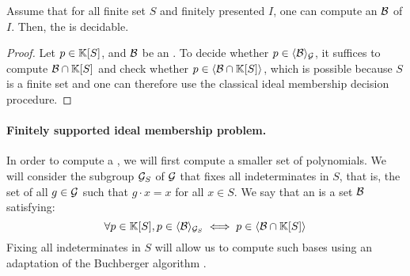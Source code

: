 \begin{lemma}
    Assume that for all finite set $S$ and 
    finitely presented  $I$,
    one can compute an 
     $\Basis$ of $I$.
    Then, the
    is decidable.
\end{lemma}
\begin{proof}
    Let $p \in \mathbb{K}[S]$, 
    and $\Basis$ be an .
    To decide whether $p \in \gen{\Basis}{\group}$,
    it suffices to compute $\Basis \cap \poly{\K}{S}$
    and check whether 
    $p \in \gen{\Basis \cap \poly{\K}{S}}{}$, which is possible
    because $S$ is a finite set and one can therefore use 
    the classical ideal membership decision procedure.
\end{proof}

\paragraph{Finitely supported ideal membership problem.}
In order to compute a , we will first compute
a smaller set of polynomials.
We will consider the subgroup $\mathcal{G}_S$ of $\mathcal{G}$ that fixes
all indeterminates in $S$, that is, the set of all $g \in \mathcal{G}$
such that $g \cdot x = x$ for all $x \in S$.
We say that
an  is a set $\Basis$
satisfying:
\begin{equation*}
    \label{eq:supp-grob}
    \forall p \in \poly{\K}{S},
    p \in \gen{\Basis}{\group_S}
    \iff
    p \in \gen{\Basis \cap \poly{\K}{S}}{}
\end{equation*}
Fixing all indeterminates in $S$ will allow us to compute 
such bases using an adaptation of the Buchberger algorithm
\cite{BUCH76}.

